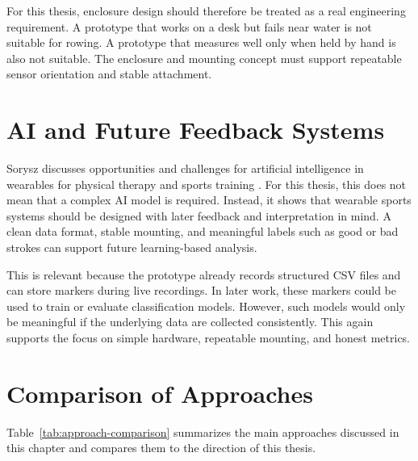 For this thesis, enclosure design should therefore be treated as a real engineering requirement. A prototype that works on a desk but fails near water is not suitable for rowing. A prototype that measures well only when held by hand is also not suitable. The enclosure and mounting concept must support repeatable sensor orientation and stable attachment.

\section{AI and Future Feedback Systems}

Sorysz discusses opportunities and challenges for artificial intelligence in wearables for physical therapy and sports training \cite{sorysz_artificial_2024}. For this thesis, this does not mean that a complex AI model is required. Instead, it shows that wearable sports systems should be designed with later feedback and interpretation in mind. A clean data format, stable mounting, and meaningful labels such as good or bad strokes can support future learning-based analysis.

This is relevant because the prototype already records structured CSV files and can store markers during live recordings. In later work, these markers could be used to train or evaluate classification models. However, such models would only be meaningful if the underlying data are collected consistently. This again supports the focus on simple hardware, repeatable mounting, and honest metrics.

\section{Comparison of Approaches}

Table~\ref{tab:approach-comparison} summarizes the main approaches discussed in this chapter and compares them to the direction of this thesis.

